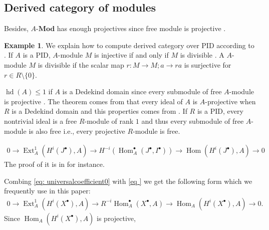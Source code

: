 \documentclass[a4paper,dvipdfmx,reqno,12pt]{amsart}
\theoremstyle{definition}
\newtheorem{Eg}[Thm]{Example}
\newcommand{\opn}[1]{\operatorname{#1}}
\newcommand{\catn}[1]{\mathbf{#1}}
\numberwithin{equation}{section}
\begin{document}
\subsection{Derived category of modules}

Besides, $A\text{-}\catn{Mod}$ has enough projectives since free module is projective \cite[Proposition 2.2.1]{MR1269324}.

\begin{Eg}
  We explain how to compute derived category over PID according to \cite[1.4]{MR2050072}.
  If $A$ is a PID, $A$-module $M$ is injective if and only if $M$ is divisible \cite[Corollary 2.3.2]{MR1269324}.
  A $A$-module $M$ is divisible if the scalar map $r:M\to M; a\to ra$ is surjective for $r\in R\setminus\{0\}$.


  $\opn{hd}(A)\leq 1$ if $A$ is a Dedekind domain since every submodule of free $A$-module is projective \cite[Theorem 4.2.11, Exercise 4.2.6]{MR1269324}.
  The theorem comes from that every ideal of $A$ is $A$-projective when $R$ is a Dedekind domain and this properties comes from \cite[Theorem 7.12]{MR1011461}.
  If $R$ is a PID, every nontrivial ideal is a free $R$-module of rank $1$ and thus every submodule of free $A$-module is also free i.e., every projective $R$-module is free.



  \begin{align} \label{eq: universalcoefficient0}
    0\to \opn{Ext}^{1}_{A}(H^{i}(J^{\bullet}),A)\to H^{-i}(\opn{Hom}_A^{\bullet}(J^{\bullet},I^{\bullet}))\to \opn{Hom}(H^{i}(J^{\bullet}),A)  \to  0
  \end{align}
  The proof of it is in \cite[V. Theorem 3.1]{} for instance.

  Combing \cref{eq: universalcoefficient0} with \cref{eq } we get the following form which we frequently use in this paper:
  \begin{align} \label{eq: universalcoefficient}
    0\to \opn{Ext}^{1}_{A}(H^{i}(X^{\bullet}),A)\to R^{-i}\opn{Hom}_{A}^{\bullet}(X^{\bullet},A) \to \opn{Hom}_{A}(H^{i}(X^{\bullet}),A)  \to  0.
  \end{align}
  Since $\opn{Hom}_{A}(H^{i}(X^{\bullet}),A)$ is projective,

\end{Eg}
\end{document}

